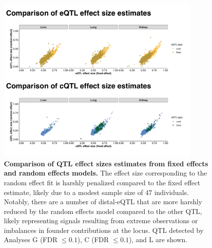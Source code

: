 \documentclass[10pt,letterpaper,twoside]{article}
\begin{document}
\begin{figure}[hp]
\renewcommand{\familydefault}{\sfdefault}\normalfont
\centering
\includegraphics[width=0.9\textwidth, trim={0in 0in 0in 0in}, clip]{figs/fixefvsranef_qtl.pdf}
\caption{\textbf{Comparison of QTL effect sizes estimates from fixed effects and random effects models.} 
The effect size corresponding to the random effect fit is harshly penalized compared to the fixed effect estimate, likely due to a modest sample size of 47 individuals. Notably, there are a number of distal-eQTL that are more harshly reduced by the random effects model compared to the other QTL, likely representing signals resulting from extreme observations or imbalances in founder contributions at the locus. QTL detected by Analyses G (FDR $\le 0.1$), C (FDR $\le 0.1$), and L are shown.
\label{fig:qtl_effect_size_fixefvsranef}}
\end{figure}
\end{document}
